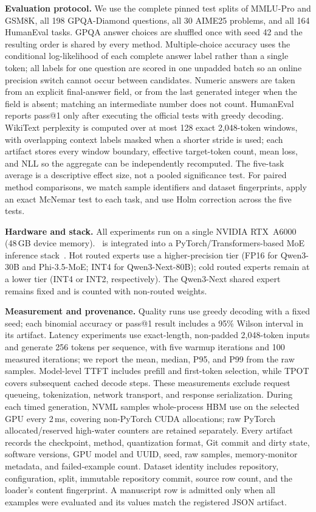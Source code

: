 \noindent\textbf{Evaluation protocol.}
We use the complete pinned test splits of MMLU-Pro and GSM8K, all 198 GPQA-Diamond questions, all 30 AIME25 problems, and all 164 HumanEval tasks. GPQA answer choices are shuffled once with seed 42 and the resulting order is shared by every method. Multiple-choice accuracy uses the conditional log-likelihood of each complete answer label rather than a single token; all labels for one question are scored in one unpadded batch so an online precision switch cannot occur between candidates. Numeric answers are taken from an explicit final-answer field, or from the last generated integer when the field is absent; matching an intermediate number does not count. HumanEval reports pass@1 only after executing the official tests with greedy decoding. WikiText perplexity is computed over at most 128 exact 2,048-token windows, with overlapping context labels masked when a shorter stride is used; each artifact stores every window boundary, effective target-token count, mean loss, and NLL so the aggregate can be independently recomputed. The five-task average is a descriptive effect size, not a pooled significance test. For paired method comparisons, we match sample identifiers and dataset fingerprints, apply an exact McNemar test to each task, and use Holm correction across the five tests.

\noindent\textbf{Hardware and stack.}
All experiments run on a single NVIDIA RTX~A6000 (48\,GB device memory). \systemname\ is integrated into a PyTorch/Transformers-based MoE inference stack~\cite{paszke2019pytorch,wolf2020transformers}. Hot routed experts use a higher-precision tier (FP16 for Qwen3-30B and Phi-3.5-MoE; INT4 for Qwen3-Next-80B); cold routed experts remain at a lower tier (INT4 or INT2, respectively). The Qwen3-Next shared expert remains fixed and is counted with non-routed weights.

\noindent\textbf{Measurement and provenance.}
Quality runs use greedy decoding with a fixed seed; each binomial accuracy or pass@1 result includes a 95\% Wilson interval in its artifact. Latency experiments use exact-length, non-padded 2,048-token inputs and generate 256 tokens per sequence, with five warmup iterations and 100 measured iterations; we report the mean, median, P95, and P99 from the raw samples. Model-level TTFT includes prefill and first-token selection, while TPOT covers subsequent cached decode steps. These measurements exclude request queueing, tokenization, network transport, and response serialization. During each timed generation, NVML samples whole-process HBM use on the selected GPU every 2\,ms, covering non-PyTorch CUDA allocations; raw PyTorch allocated/reserved high-water counters are retained separately. Every artifact records the checkpoint, method, quantization format, Git commit and dirty state, software versions, GPU model and UUID, seed, raw samples, memory-monitor metadata, and failed-example count. Dataset identity includes repository, configuration, split, immutable repository commit, source row count, and the loader's content fingerprint. A manuscript row is admitted only when all examples were evaluated and its values match the registered JSON artifact.

